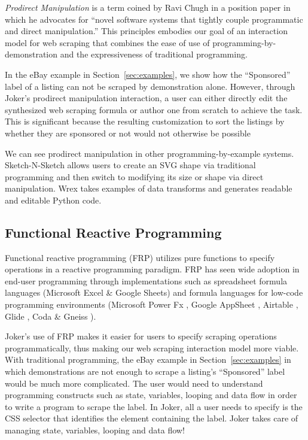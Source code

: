 \documentclass[sigconf,10pt]{acmart}
\begin{document}
\emph{Prodirect Manipulation} is a term coined by Ravi Chugh in a
position paper \citep{chugh2016a} in which he advocates for ``novel
software systems that tightly couple programmatic and direct
manipulation.'' This principles embodies our goal of an interaction
model for web scraping that combines the ease of use of
programming-by-demonstration and the expressiveness of traditional
programming.

In the eBay example in Section~\ref{sec:examples}, we show how the
``Sponsored'' label of a listing can not be scraped by demonstration
alone. However, through Joker's prodirect manipulation interaction, a
user can either directly edit the synthesized web scraping formula or
author one from scratch to achieve the task. This is significant because
the resulting customization to sort the listings by whether they are
sponsored or not would not otherwise be possible

We can see prodirect manipulation in other programming-by-example
systems. Sketch-N-Sketch \citep{chugh2016} allows users to create an SVG
shape via traditional programming and then switch to modifying its size
or shape via direct manipulation. Wrex \citep{drosos2020} takes examples
of data transforms and generates readable and editable Python code.

\hypertarget{functional-reactive-programming}{%
\subsection{Functional Reactive
Programming}\label{functional-reactive-programming}}

Functional reactive programming (FRP) utilizes pure functions to specify
operations in a reactive programming paradigm. FRP has seen wide
adoption in end-user programming through implementations such as
spreadsheet formula languages (Microsoft Excel \& Google Sheets) and
formula languages for low-code programming environments (Microsoft Power
Fx \citep{2021g}, Google AppSheet \citep{2021h}, Airtable \citep{2021f},
Glide \citep{2021a}, Coda \citep{2021c} \& Gneiss \citep{chang2014}).

Joker's use of FRP makes it easier for users to specify scraping
operations programmatically, thus making our web scraping interaction
model more viable. With traditional programming, the eBay example in
Section~\ref{sec:examples} in which demonstrations are not enough to
scrape a listing's ``Sponsored'' label would be much more complicated.
The user would need to understand programming constructs such as state,
variables, looping and data flow in order to write a program to scrape
the label. In Joker, all a user needs to specify is the CSS selector
that identifies the element containing the label. Joker takes care of
managing state, variables, looping and data flow!
\end{document}
